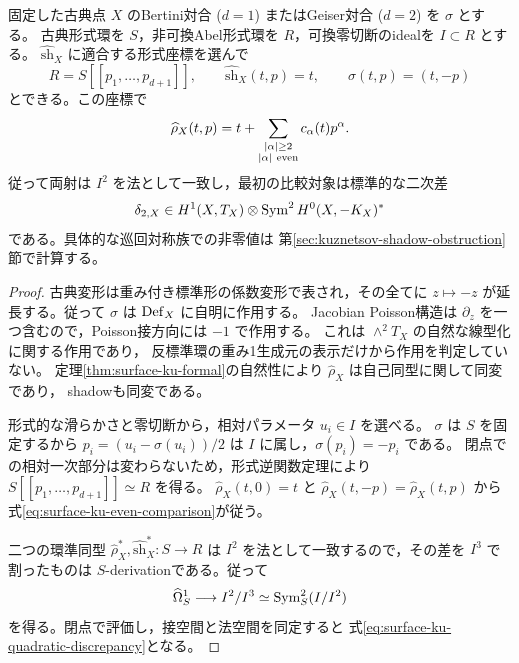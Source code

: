 \begin{proposition}[被覆対合とPoisson方向の二次差]
\label{prop:surface-ku-parity}
固定した古典点 $X$ のBertini対合 ($d=1$) またはGeiser対合 ($d=2$) を $\sigma$ とする。
古典形式環を $S$，非可換Abel形式環を $R$，可換零切断のidealを $I\subset R$ とする。
$\widehat{\mathrm{sh}}_X$ に適合する形式座標を選んで
\[
 R=S[[p_1,\ldots,p_{d+1}]],\qquad
 \widehat{\mathrm{sh}}_X(t,p)=t,\qquad \sigma(t,p)=(t,-p)
\]
とできる。この座標で
\begin{equation}\label{eq:surface-ku-even-comparison}
 \widehat\rho_X(t,p)
 =t+\sum_{\substack{|\alpha|\ge2\\|\alpha|\ {\rm even}}}
       c_\alpha(t)p^\alpha .
\end{equation}
従って両射は $I^2$ を法として一致し，最初の比較対象は標準的な二次差
\begin{equation}\label{eq:surface-ku-quadratic-discrepancy}
 \delta_{2,X}\in H^1(X,T_X)\otimes
            \operatorname{Sym}^2 H^0(X,-K_X)^*
\end{equation}
である。具体的な巡回対称族での非零値は
第\ref{sec:kuznetsov-shadow-obstruction}節で計算する。
\end{proposition}
\begin{proof}
古典変形は重み付き標準形の係数変形で表され，その全てに
$z\mapsto-z$ が延長する。従って $\sigma$ は $\operatorname{Def}_X$ に自明に作用する。
Jacobian Poisson構造は $\partial_z$ を一つ含むので，Poisson接方向には $-1$ で作用する。
これは $\wedge^2T_X$ の自然な線型化に関する作用であり，
反標準環の重み1生成元の表示だけから作用を判定していない。
定理\ref{thm:surface-ku-formal}の自然性により $\widehat\rho_X$ は自己同型に関して同変であり，
shadowも同変である。

形式的な滑らかさと零切断から，相対パラメータ $u_i\in I$ を選べる。
$\sigma$ は $S$ を固定するから
$p_i=(u_i-\sigma(u_i))/2$ は $I$ に属し，$\sigma(p_i)=-p_i$ である。
閉点での相対一次部分は変わらないため，形式逆関数定理により
$S[[p_1,\ldots,p_{d+1}]]\simeq R$ を得る。
$\widehat\rho_X(t,0)=t$ と
$\widehat\rho_X(t,-p)=\widehat\rho_X(t,p)$ から式\eqref{eq:surface-ku-even-comparison}が従う。

二つの環準同型 $\widehat\rho_X^*,\widehat{\mathrm{sh}}_X^*:S\to R$ は
$I^2$ を法として一致するので，その差を $I^3$ で割ったものは
$S$-derivationである。従って
\[
 \widehat\Omega^1_S\longrightarrow I^2/I^3
   \simeq\operatorname{Sym}^2_S(I/I^2)
\]
を得る。閉点で評価し，接空間と法空間を同定すると
式\eqref{eq:surface-ku-quadratic-discrepancy}となる。
\end{proof}

